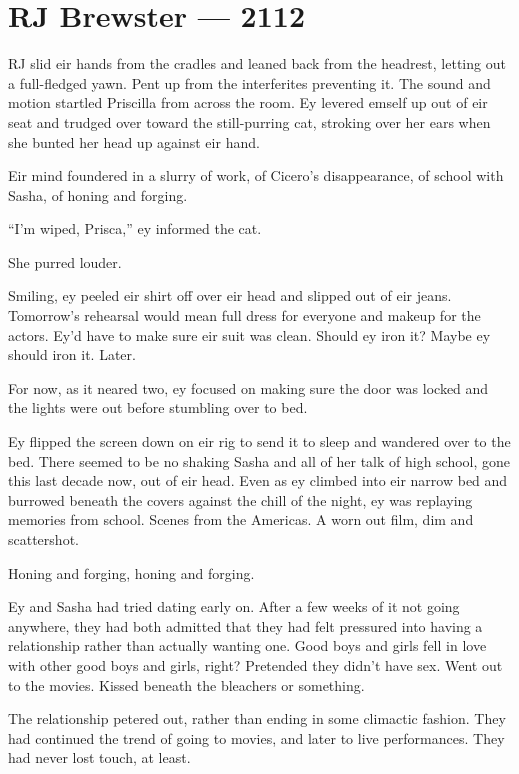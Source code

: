 \hypertarget{rj-brewster-2112}{%
\chapter*{RJ Brewster — 2112}\label{rj-brewster-2112}}

RJ slid eir hands from the cradles and leaned back from the headrest, letting out a full-fledged yawn. Pent up from the interferites preventing it. The sound and motion startled Priscilla from across the room. Ey levered emself up out of eir seat and trudged over toward the still-purring cat, stroking over her ears when she bunted her head up against eir hand.

Eir mind foundered in a slurry of work, of Cicero's disappearance, of school with Sasha, of honing and forging.

``I'm wiped, Prisca,'' ey informed the cat.

She purred louder.

Smiling, ey peeled eir shirt off over eir head and slipped out of eir jeans. Tomorrow's rehearsal would mean full dress for everyone and makeup for the actors. Ey'd have to make sure eir suit was clean. Should ey iron it? Maybe ey should iron it. Later.

For now, as it neared two, ey focused on making sure the door was locked and the lights were out before stumbling over to bed.

Ey flipped the screen down on eir rig to send it to sleep and wandered over to the bed. There seemed to be no shaking Sasha and all of her talk of high school, gone this last decade now, out of eir head. Even as ey climbed into eir narrow bed and burrowed beneath the covers against the chill of the night, ey was replaying memories from school. Scenes from the Americas. A worn out film, dim and scattershot.

Honing and forging, honing and forging.

Ey and Sasha had tried dating early on. After a few weeks of it not going anywhere, they had both admitted that they had felt pressured into having a relationship rather than actually wanting one. Good boys and girls fell in love with other good boys and girls, right? Pretended they didn't have sex. Went out to the movies. Kissed beneath the bleachers or something.

The relationship petered out, rather than ending in some climactic fashion. They had continued the trend of going to movies, and later to live performances. They had never lost touch, at least.

